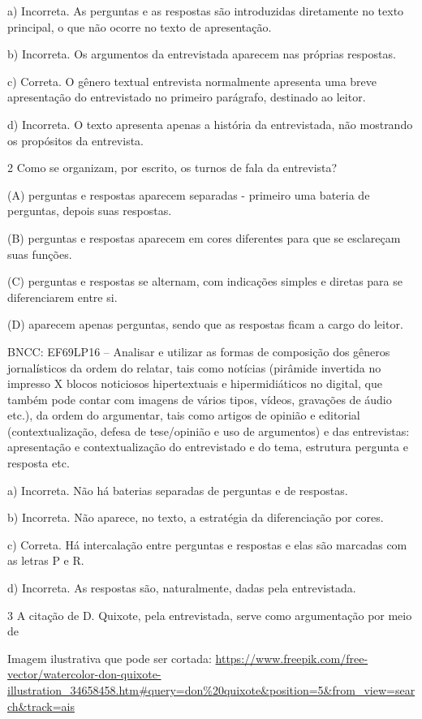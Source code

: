 \begin{itemize}
\begin{itemize}
{\begin{itemize}
\begin{itemize}
\begin{escolha}
\begin{escolha}
\begin{escolha}
\begin{escolha}
\begin{escolha}
a) Incorreta. As perguntas e as respostas são introduzidas diretamente
no texto principal, o que não ocorre no texto de apresentação.

b) Incorreta. Os argumentos da entrevistada aparecem nas próprias
respostas.

c) Correta. O gênero textual entrevista normalmente apresenta uma breve
apresentação do entrevistado no primeiro parágrafo, destinado ao leitor.

d) Incorreta. O texto apresenta apenas a história da entrevistada, não
mostrando os propósitos da entrevista.

\num{2} Como se organizam, por escrito, os turnos de fala da entrevista?

(A) perguntas e respostas aparecem separadas - primeiro uma bateria de
perguntas, depois suas respostas.

(B) perguntas e respostas aparecem em cores diferentes para que se
esclareçam suas funções.

(C) perguntas e respostas se alternam, com indicações simples e diretas
para se diferenciarem entre si.

(D) aparecem apenas perguntas, sendo que as respostas ficam a cargo do
leitor.

BNCC: EF69LP16 -- Analisar e utilizar as formas de composição dos
gêneros jornalísticos da ordem do relatar, tais como notícias (pirâmide
invertida no impresso X blocos noticiosos hipertextuais e
hipermidiáticos no digital, que também pode contar com imagens de vários
tipos, vídeos, gravações de áudio etc.), da ordem do argumentar, tais
como artigos de opinião e editorial (contextualização, defesa de
tese/opinião e uso de argumentos) e das entrevistas: apresentação e
contextualização do entrevistado e do tema, estrutura pergunta e
resposta etc.

a) Incorreta. Não há baterias separadas de perguntas e de respostas.

b) Incorreta. Não aparece, no texto, a estratégia da diferenciação por
cores.

c) Correta. Há intercalação entre perguntas e respostas e elas são
marcadas com as letras P e R.

d) Incorreta. As respostas são, naturalmente, dadas pela entrevistada.

\num{3} A citação de D. Quixote, pela entrevistada, serve como
argumentação por meio de

Imagem ilustrativa que pode ser cortada:
\url{https://www.freepik.com/free-vector/watercolor-don-quixote-illustration_34658458.htm\#query=don\%20quixote\&position=5\&from_view=search\&track=ais}


\end{escolha}
\end{escolha}
\end{escolha}
\end{escolha}
\end{escolha}
\end{itemize}
\end{itemize}}
\end{itemize}
\end{itemize}

